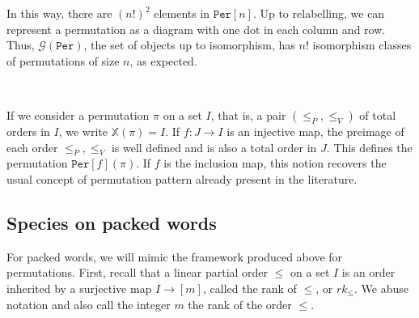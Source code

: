 \documentclass[12pt, reqno]{amsart}
\theoremstyle{definition}
\begin{document}
In this way, there are $(n!)^2 $ elements in $\mathtt{Per}[n]$.
Up to relabelling, we can represent a permutation as a diagram with one dot in each column and row.
Thus, $\mathcal{G}(\mathtt{Per})$, the set of objects up to isomorphism, has $n!$ isomorphism classes of permutations of size $n$, as expected.

\

\label{defin:per}
If we consider a permutation $\pi$ on a set $I$, that is, a pair $(\leq_P, \leq_V) $ of total orders in $I$, we write $\mathbb{X}(\pi) = I$.
If $f:J \to I $ is an injective map, the preimage of each order $\leq_P, \leq_V$ is well defined and is also a total order in $J$.
This defines the permutation $\mathtt{Per}[f](\pi )$.
If $f$ is the inclusion map, this notion recovers the usual concept of permutation pattern already present in the literature.





\subsection{Species on packed words}


For packed words, we will mimic the framework produced above for permutations.
First, recall that a linear partial order $\leq$ on a set $I$ is an order inherited by a surjective map $I \to [m]$, called the rank of $\leq$, or $rk_{\leq}$.
We abuse notation and also call the integer $m$ the rank of the order $\leq$.
\end{document}
